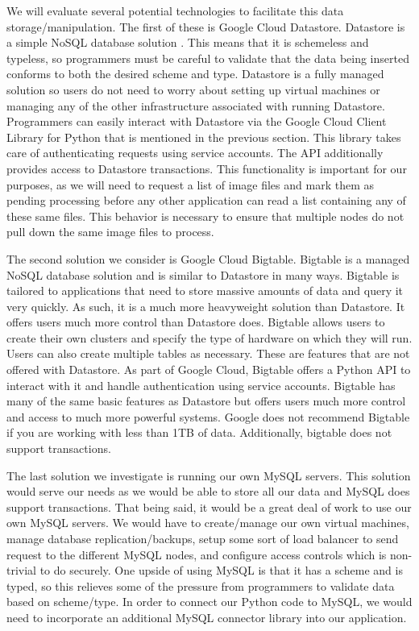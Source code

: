 \documentclass[10pt, onecolumn, draftclsnofoot, letterpaper, compsoc]{IEEEtran}
\begin{document}
We will evaluate several potential technologies to facilitate this data 
storage/manipulation. The first of these is Google Cloud Datastore. Datastore 
is a simple NoSQL database solution \cite{cloudDatastore}. This means that it is 
schemeless and typeless, so programmers must be careful to validate that the 
data being inserted conforms to both the desired scheme and type. 
Datastore is a fully managed solution so users do not need to worry about setting 
up virtual machines or managing any of the other infrastructure associated with 
running Datastore\cite{cloudDatastore}. Programmers can easily interact with Datastore 
via the Google Cloud Client Library for Python that is mentioned in the previous 
section\cite{cloudDatastoreDocs}. This library takes care of authenticating requests 
using service accounts\cite{cloudDatastoreDocs}. The API additionally provides access 
to Datastore transactions\cite{cloudDatastoreDocs}. This functionality is important for 
our purposes, as we will need to request a list of image files and mark them as pending 
processing before any other application can read a list containing any of these same files. 
This behavior is necessary to ensure that multiple nodes do not pull down the same image 
files to process.

The second solution we consider is Google Cloud Bigtable. Bigtable is a managed NoSQL 
database solution and is similar to Datastore in many ways\cite{cloudBigtable}. 
Bigtable is tailored to applications that need to store massive amounts of data 
and query it very quickly\cite{cloudBigtable}. As such, it is a much more heavyweight 
solution than Datastore. It offers users much more control than Datastore does. 
Bigtable allows users to create their own clusters and specify the type of hardware on 
which they will run\cite{cloudBigtableDocs}. Users can also create multiple tables 
as necessary\cite{cloudBigtableDocs}. These are features that are not offered with 
Datastore. As part of Google Cloud, Bigtable offers a Python API to interact with it 
and handle authentication using service accounts\cite{cloudBigtableDocs}. Bigtable has 
many of the same basic features as Datastore but offers users much more control 
and access to much more powerful systems. Google does not recommend Bigtable if 
you are working with less than 1TB of data\cite{cloudBigtable}. Additionally, 
bigtable does not support transactions\cite{cloudBigtable}.

The last solution we investigate is running our own MySQL servers. This solution 
would serve our needs as we would be able to store all our data and MySQL 
does support transactions. That being said, it would be a great deal of work to 
use our own MySQL servers. We would have to create/manage our own virtual machines, 
manage database replication/backups, setup some sort of load balancer to send 
request to the different MySQL nodes, and configure access controls which is 
non-trivial to do securely. One upside of using MySQL is that it has a scheme 
and is typed, so this relieves some of the pressure from programmers to 
validate data based on scheme/type. In order to connect our Python code to MySQL,
we would need to incorporate an additional MySQL connector library into our 
application\cite{mysql}.
\end{document}

